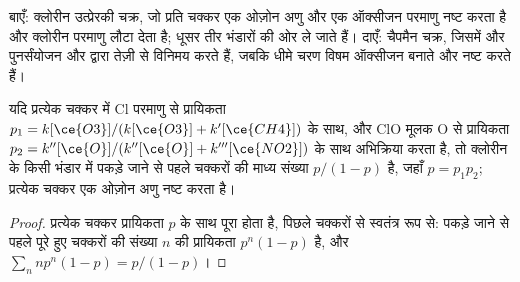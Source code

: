 \begin{omfigure}

{\small बाएँ: क्लोरीन उत्प्रेरकी चक्र, जो प्रति चक्कर एक ओज़ोन अणु और
एक ऑक्सीजन परमाणु नष्ट करता है और क्लोरीन परमाणु लौटा देता है; धूसर तीर
भंडारों की ओर ले जाते हैं। दाएँ: चैपमैन चक्र, जिसमें  और 
पुनर्संयोजन और  द्वारा तेज़ी से विनिमय करते हैं, जबकि धीमे चरण विषम ऑक्सीजन
बनाते और नष्ट करते हैं।}
\end{omfigure}

\begin{proposition}[क्लोरीन चक्र की शृंखला लंबाई]\label{prop:b3:photochemistry:catalytic-destruction}
यदि प्रत्येक चक्कर में Cl परमाणु  से प्रायिकता $p_1 =
k[\ce{O3}]/(k[\ce{O3}] + k'[\ce{CH4}])$ के साथ, और ClO मूलक O से प्रायिकता $p_2 =
k''[\ce{O}]/(k''[\ce{O}] + k'''[\ce{NO2}])$ के साथ अभिक्रिया करता है, तो क्लोरीन के किसी भंडार में
पकड़े जाने से पहले चक्करों की माध्य संख्या $p/(1 - p)$ है, जहाँ $p = p_1p_2$; प्रत्येक चक्कर एक
ओज़ोन अणु नष्ट करता है।
\end{proposition}

\begin{proof}
प्रत्येक चक्कर प्रायिकता $p$ के साथ पूरा होता है, पिछले चक्करों से
स्वतंत्र रूप से: पकड़े जाने से पहले पूरे हुए चक्करों की संख्या $n$ की प्रायिकता $p^n(1 -
p)$ है, और $\sum_nnp^n(1 - p) = p/(1 - p)$।
\end{proof}

